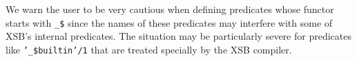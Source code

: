 We warn the user to be very cautious when defining predicates whose functor
starts with {\tt \_\$}  since the names of these predicates may interfere with
some of XSB's internal predicates.  The situation may be particularly
severe for predicates like {\tt '\_\$builtin'/1} that are treated specially
by the XSB compiler.





